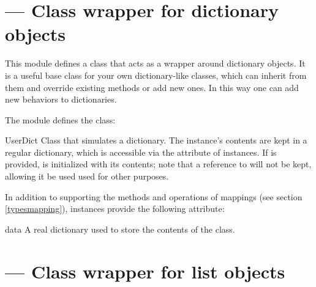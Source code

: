 \section{ ---
         Class wrapper for dictionary objects}



This module defines a class that acts as a wrapper around
dictionary objects.  It is a useful base class for
your own dictionary-like classes, which can inherit from
them and override existing methods or add new ones.  In this way one
can add new behaviors to dictionaries.

The  module defines the  class:

\begin{classdesc}{UserDict}{}
Class that simulates a dictionary.  The instance's
contents are kept in a regular dictionary, which is accessible via the
 attribute of  instances.  If
 is provided,  is initialized with its
contents; note that a reference to  will not be kept, 
allowing it be used used for other purposes.
\end{classdesc}

In addition to supporting the methods and operations of mappings (see
section \ref{typesmapping}),  instances provide the
following attribute:

\begin{memberdesc}{data}
A real dictionary used to store the contents of the 
class.
\end{memberdesc}


\section{ ---
         Class wrapper for list objects}




